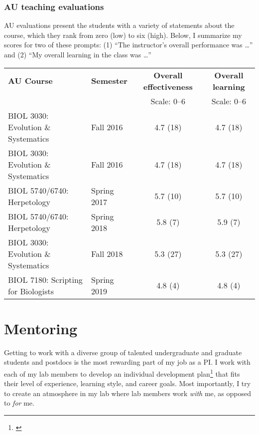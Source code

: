 \subsubsection*{AU teaching evaluations}
AU evaluations present the students with a variety of statements about the
course,
which they rank from zero (low) to six (high).
Below, I summarize my scores for two of these prompts:
(1) ``The instructor's overall performance was \ldots''
and
(2) ``My overall learning in the class was \ldots''
\begin{center}
\begin{tabular}{l l c c}
    \hline
    \textbf{AU Course} & \textbf{Semester} & \textbf{Overall effectiveness} & \textbf{Overall learning} \\
                       &                   & Scale: 0--6                    & Scale: 0--6 \\
    \hline
    BIOL 3030: Evolution \& Systematics & Fall 2016 & 4.7 (18) & 4.7 (18) \\
    BIOL 3030: Evolution \& Systematics & Fall 2016 & 4.7 (18) & 4.7 (18) \\
    BIOL 5740/6740: Herpetology & Spring 2017 & 5.7 (10) & 5.7 (10) \\
    BIOL 5740/6740: Herpetology & Spring 2018 & 5.8 (7) & 5.9 (7) \\
    BIOL 3030: Evolution \& Systematics & Fall 2018 & 5.3 (27) & 5.3 (27) \\
    BIOL 7180: Scripting for Biologists & Spring 2019 & 4.8 (4) & 4.8 (4) \\
    \hline
\end{tabular}
\end{center}

\section*{Mentoring}
Getting to work with a diverse group of talented undergraduate and graduate
students and postdocs is the most rewarding part of my job as a PI.
I work with each of my lab members to develop an individual development
plan\footnote{\label{idp}} that fits
their level of experience, learning style, and career goals.
Most importantly, I try to create an atmosphere in my lab where
lab members work \emph{with} me, as opposed to \emph{for} me.

